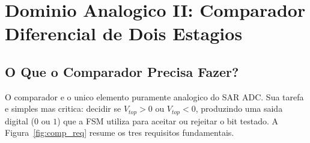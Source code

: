 \documentclass[12pt, a4paper]{article}
\begin{document}
\section{Dominio Analogico II: Comparador Diferencial de Dois Estagios}
\label{sec:comp}

\subsection{O Que o Comparador Precisa Fazer?}

O comparador e o unico elemento puramente analogico do SAR ADC. Sua tarefa e simples mas
critica: decidir se $V_{top} > 0$ ou $V_{top} < 0$, produzindo uma saida digital ($0$ ou $1$)
que a FSM utiliza para aceitar ou rejeitar o bit testado. A Figura~\ref{fig:comp_req} resume
os tres requisitos fundamentais.
\end{document}
